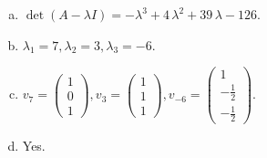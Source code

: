 \begin{questions}
\begin{solution}
\begin{enumerate}[(a)]
\item $\det(A-\lambda I)=-{\lambda}^{3} + 4 \, {\lambda}^{2} + 39 \, {\lambda} - 126$.
\item ${\lambda}_1=7, {\lambda}_2=3, {\lambda}_3=-6$.
\item $v_{7}=\left(\begin{array}{r}
1 \\
0 \\
1
\end{array}\right), v_{3}=\left(\begin{array}{r}
1 \\
1 \\
1
\end{array}\right), v_{-6}=\left(\begin{array}{r}
1 \\
-\frac{1}{2} \\
-\frac{1}{2}
\end{array}\right)$.
\item Yes.
\end{enumerate}
\end{solution}

\end{questions}

\newpage


\begin{center}
\end{center}

